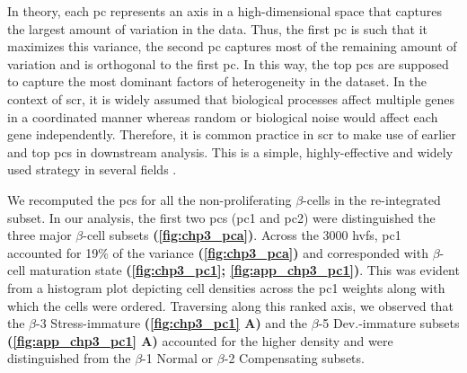 \par In theory, each \acrfull{pc} represents an axis in a high-dimensional space that captures the largest amount of variation in the data. Thus, the first \gls{pc} is such that it maximizes this variance, the second \gls{pc} captures most of the remaining amount of variation and is orthogonal to the first \gls{pc}. In this way, the top \glspl{pc} are supposed to capture the most dominant factors of heterogeneity in the dataset. In the context of \gls{scr}, it is widely assumed that biological processes affect multiple genes in a coordinated manner whereas random or biological noise would affect each gene independently. Therefore, it is common practice in \gls{scr} to make use of earlier and top \glspl{pc} in downstream analysis. This is a simple, highly-effective and widely used strategy in several fields \textbf{\cite{https://bioconductor.org/books/3.13/OSCA.basic/dimensionality-reduction.html}}.\\

\par We recomputed the \glspl{pc} for all the non-proliferating $\beta$-cells in the re-integrated subset. In our analysis, the first two \glspl{pc} (\gls{pc}1 and \gls{pc}2) were distinguished the three major $\beta$-cell subsets \textbf{(\autoref{fig:chp3_pca})}. Across the 3000 \glspl{hvf}, \gls{pc}1 accounted for 19\% of the variance \textbf{(\autoref{fig:chp3_pca})} and corresponded with $\beta$-cell maturation state \textbf{(\autoref{fig:chp3_pc1}; \autoref{fig:app_chp3_pc1})}. This was evident from a histogram plot depicting cell densities across the \gls{pc}1 weights along with which the cells were ordered. Traversing along this ranked axis, we observed that the $\beta$-3 Stress-immature \textbf{(\autoref{fig:chp3_pc1} A)} and the $\beta$-5 Dev.-immature subsets \textbf{(\autoref{fig:app_chp3_pc1} A)} accounted for the higher density and were distinguished from the $\beta$-1 Normal or $\beta$-2 Compensating subsets.\\


